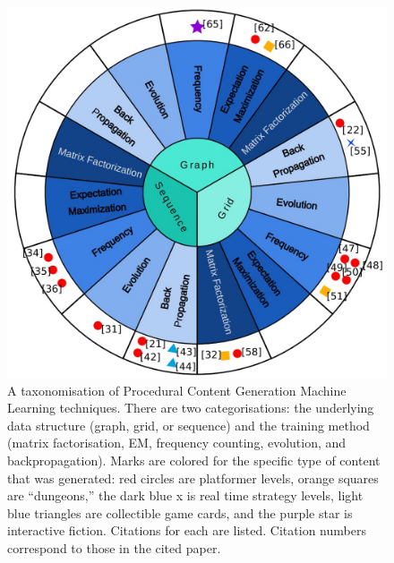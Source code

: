 \begin{figure}[H]
    \centering
    \includegraphics[width=\textwidth, height=0.5\textheight, keepaspectratio]{Images/PCGMLTaxonomy.jpg}
    \caption{A taxonomisation of Procedural Content Generation Machine Learning techniques. There are two categorisations: the underlying data structure (graph, grid, or sequence) and the training method (matrix factorisation, EM, frequency counting, evolution, and backpropagation). Marks are colored for the specific type of content that was generated: red circles are platformer levels, orange squares are ``dungeons,'' the dark blue x is real time strategy levels, light blue triangles are collectible game cards, and the purple star is interactive fiction. Citations for each are listed. Citation numbers correspond to those in the cited paper. \cite{PCGML}}
    \label{fig:pcgml}
\end{figure}

